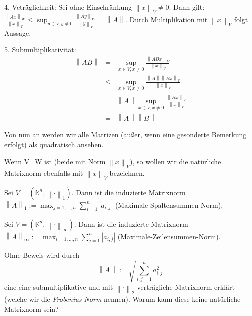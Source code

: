 \documentclass[10pt]{scrbook}
\begin{document}
\begin{bew}
4. Veträglichkeit:
Sei ohne Einschränkung $\left\|x\right\|_V\neq 0$. Dann gilt: $\frac{\left\|A x\right\|_W}{\left\|x\right\|_V}\leq \sup_{y\in V, y\neq 0}\frac{\left\|A y\right\|_W}{\left\|y\right\|_V}=\left\|A\right\|$. Durch Multiplikation mit $\left\|x\right\|_V$ folgt Aussage.

5. Submultiplikativität:
\begin{eqnarray*}
\left\|A B\right\| & = & \sup_{x\in V, x\neq 0}\frac{\left\|A B x\right\|_V}{\left\|x\right\|_V} \\
& \leq & \sup_{x\in V, x\neq 0}\frac{\left\|A\right\| \left\|B x\right\|_V}{\left\|x\right\|_V} \\
& = & \left\|A\right\| \sup_{x\in V, x\neq 0}\frac{\left\|B x\right\|_V}{\left\|x\right\|_V} \\
& = & \left\|A\right\| \left\|B\right\|
\end{eqnarray*}
\end{bew}

\begin{Bem}
Von nun an werden wir alle Matrizen (außer, wenn eine gesonderte Bemerkung erfolgt) als quadratisch ansehen.
\end{Bem}

\begin{Def}
Wenn V=W ist (beide mit Norm $\left\|x\right\|_V$), so wollen wir die natürliche Matrixnorm ebenfalls mit $\left\|x\right\|_V$ bezeichnen.
\end{Def}

\begin{Bsp}
Sei $V=(\mathbb{K}^n, \left\|\cdot\right\|_1)$. Dann ist die induzierte Matrixnorm $\left\|A\right\|_1:=\max_{j=1, \ldots, n} \sum_{i=1}^n\left|a_{i, j}\right|$ (Maximale-Spaltensummen-Norm).
\end{Bsp}

\begin{Bsp}
Sei $V=(\mathbb{K}^n, \left\|\cdot\right\|_\infty)$. Dann ist die induzierte Matrixnorm $\left\|A\right\|_\infty:=\max_{i=1, \ldots, n} \sum_{j=1}^n\left|a_{i, j}\right|$ (Maximale-Zeilensummen-Norm).
\end{Bsp}

\begin{Auf}
Ohne Beweis wird durch
\begin{displaymath}
	 \left\|A\right\|:=\sqrt{\sum_{i, j=1}^n a_{i, j}^2}
\end{displaymath}
eine eine submultiplikative und mit $\left\|\cdot\right\|_2$ verträgliche Matrixnorm erklärt (welche wir die \emph{Frobenius-Norm} nennen). Warum kann diese keine natürliche Matrixnorm sein?
\end{Auf}
\end{document}
